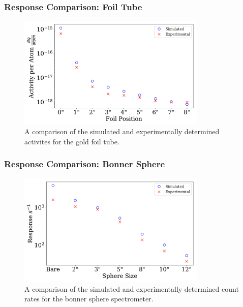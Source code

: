 \documentclass[fleqn]{beamer}
\begin{document}
\begin{frame}
\frametitle{Response Comparison: Foil Tube}

\begin{figure}
\centering
\includegraphics[width = 0.8\textwidth]{compare_activities}
\caption{A comparison of the simulated and experimentally determined activites for the gold foil tube.}
\end{figure}

\end{frame}

\begin{frame}
\frametitle{Response Comparison: Bonner Sphere}

\begin{figure}
\centering
\includegraphics[width = 0.8\textwidth]{compare_countrates}
\caption{A comparison of the simulated and experimentally determined count rates for the bonner sphere spectrometer.}
\end{figure}

\end{frame}
\end{document}
